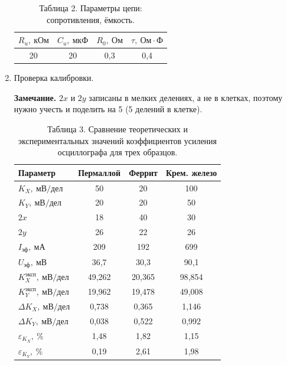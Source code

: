 \documentclass[a4paper]{article}
\begin{document}
\begin{enumerate}
\begin{table}[h!]
    \centering
    \begin{tabular}{|c|c|c|c|}
        \hline
        $R_u,\ \text{кОм}$ & $C_u,\ \text{мкФ}$ & $R_0,\ \text{Ом}$ & $\tau,\ \text{Ом}\cdot\text{Ф}$ \\ \hline
        20 & 20 & 0{,}3 & 0{,}4 \\ \hline
    \end{tabular}
    \caption{Таблица 2. Параметры цепи: сопротивления, ёмкость.}
    \label{tab:circuit_params}
\end{table}

\item Проверка калибровки.

\textbf{Замечание.} $2x$ и $2y$ записаны в мелких делениях, а не в клетках, поэтому нужно учесть и поделить на 5 (5 делений в клетке).
\begin{table}[h!]
    \centering
    \begin{tabular}{|l|c|c|c|}
        \hline
        Параметр & Пермаллой & Феррит & Крем. железо \\ \hline
        $K_X,\ \text{мВ/дел}$ & 50 & 20 & 100 \\ \hline
        $K_Y,\ \text{мВ/дел}$ & 20 & 20 & 50 \\ \hline
        $2x$ & 18 & 40 & 30 \\ \hline
        $2y$ & 26 & 22 & 26 \\ \hline
        $I_{\text{эф}},\ \text{мА}$ & 209 & 192 & 699 \\ \hline
        $U_{\text{эф}},\ \text{мВ}$ & 36{,}7 & 30{,}3 & 90{,}1 \\ \hline
        $K_X^{\text{эксп}},\ \text{мВ/дел}$ & 49{,}262 & 20{,}365 & 98{,}854 \\ \hline
        $K_Y^{\text{эксп}},\ \text{мВ/дел}$ & 19{,}962 & 19{,}478 & 49{,}008 \\ \hline
        $\Delta K_X,\ \text{мВ/дел}$ & 0{,}738 & 0{,}365 & 1{,}146 \\ \hline
        $\Delta K_Y,\ \text{мВ/дел}$ & 0{,}038 & 0{,}522 & 0{,}992 \\ \hline
        $\varepsilon_{K_X},\ \%$ & 1{,}48 & 1{,}82 & 1{,}15 \\ \hline
        $\varepsilon_{K_Y},\ \%$ & 0{,}19 & 2{,}61 & 1{,}98 \\ \hline
    \end{tabular}
    \caption{Таблица 3. Сравнение теоретических и экспериментальных значений коэффициентов усиления осциллографа для трех образцов.}
    \label{tab:oscilloscope_calibration}
\end{table}


\end{enumerate}
\end{document}
